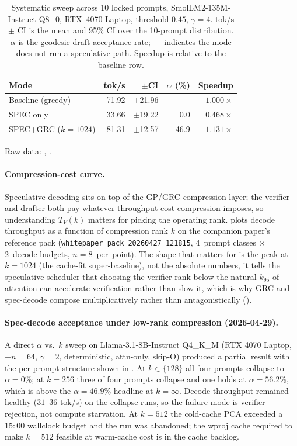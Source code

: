 \documentclass[11pt]{article}
\begin{document}
\begin{table}[h]\centering\small
\caption{Systematic sweep across 10 locked prompts, SmolLM2-135M-Instruct
Q8\_0, RTX~4070 Laptop, threshold $0.45$, $\gamma{=}4$.
tok/s $\pm$ CI is the mean and 95\% CI over the 10-prompt distribution.
$\alpha$ is the geodesic draft acceptance rate; --- indicates the mode
does not run a speculative path.  Speedup is relative to the baseline row.}
\label{tab:sweep-smollm2}
\begin{tabular}{@{}lrrrr@{}}
\toprule
Mode & tok/s & $\pm$CI & $\alpha$ (\%) & Speedup \\
\midrule
Baseline (greedy)  & 71.92 & $\pm$21.96 & ---  & $1.000\times$ \\
SPEC only          & 33.66 & $\pm$19.22 & 0.0  & $0.468\times$ \\
SPEC+GRC ($k{=}1024$) & 81.31 & $\pm$12.57 & 46.9 & $1.131\times$ \\
\bottomrule
\end{tabular}
\end{table}

Raw data: ,
.

\paragraph{Compression-cost curve.}
Speculative decoding sits on top of the GP/GRC compression layer; the
verifier and drafter both pay whatever throughput cost compression imposes,
so understanding $T_V(k)$ matters for picking the operating rank.
 plots decode throughput as a function of
compression rank $k$ on the companion paper's reference pack
(\texttt{whitepaper\_pack\_20260427\_121815}, 4~prompt classes $\times$
2~decode budgets, $n{=}8$~per~point).  The shape that matters for
 is the peak at $k{=}1024$ (the cache-fit super-baseline),
not the absolute numbers, it tells the speculative scheduler that
choosing the verifier rank below the natural $k_{95}$ of attention can
accelerate verification rather than slow it, which is why GRC and
spec-decode compose multiplicatively rather than antagonistically
().

\paragraph{Spec-decode acceptance under low-rank compression
(2026-04-29).}  A direct $\alpha$ vs.\ $k$ sweep on Llama-3.1-8B-Instruct
Q4\_K\_M (RTX 4070 Laptop, $-n{=}64$, $\gamma{=}2$, deterministic, attn-only,
skip-O) produced a partial result with the per-prompt structure shown in
. At $k{\in}\{128\}$ all four prompts collapse
to $\alpha{=}0\%$; at $k{=}256$ three of four prompts collapse and one
holds at $\alpha{=}56.2\%$, which is above the $\alpha{=}46.9\%$ headline
at $k{=}\infty$. Decode throughput remained healthy ($31$--$36$ tok/s)
on the collapse runs, so the failure mode is verifier rejection, not
compute starvation. At $k{=}512$ the cold-cache PCA exceeded a
$15{:}00$ wallclock budget and the run was abandoned; the wproj cache
required to make $k{=}512$ feasible at warm-cache cost is in the cache
backlog.
\end{document}
